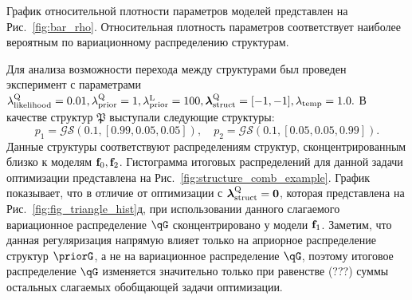 График относительной плотности параметров моделей представлен на Рис.~\ref{fig:bar_rho}. Относительная плотность параметров соответствует наиболее вероятным по вариационному распределению структурам.

Для анализа возможности перехода между структурами был проведен эксперимент с параметрами 
$\lambda_\text{likelihood}^\text{Q} = 0.01, \lambda_\text{prior}^\text{Q} = 1, \lambda_\text{prior}^\text{L} = 100, \boldsymbol{\lambda}_\text{struct}^\text{Q} = [-1, -1], \lambda_{\text{temp}} = 1.0.$
В качестве структур $\mathfrak{P}$ выступали следующие структуры:
\[
    p_1  =  \mathcal{GS}(0.1, [0.99, 0.05, 0.05]), \quad p_2  =  \mathcal{GS}(0.1, [0.05, 0.05, 0.99]).
\]
Данные структуры соответствуют распределениям структур, сконцентрированным близко к моделям $\mathbf{f}_0, \mathbf{f}_2$.
Гистограмма итоговых распределений для данной задачи оптимизации представлена на Рис.~\ref{fig:structure_comb_example}.
График показывает, что в отличие от оптимизации с $\boldsymbol{\lambda}_\text{struct}^\text{Q}=\mathbf{0}$, которая представлена на Рис.~\ref{fig:fig_triangle_hist}д, при использовании данного слагаемого вариационное распределение $\qG$ сконцентрировано у модели $\mathbf{f}_1$.
Заметим, что данная регуляризация напрямую влияет только на априорное распределение структур $\priorG$, а не на вариационное распределение $\qG$, поэтому итоговое распределение $\qG$ изменяется значительно только при равенстве (???) суммы остальных слагаемых обобщающей задачи оптимизации.



